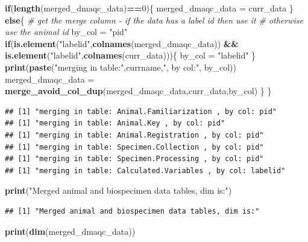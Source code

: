 \documentclass[]{article}
\newenvironment{Shaded}{\begin{snugshade}}{\end{snugshade}}
\newcommand{\KeywordTok}[1]{\textcolor[rgb]{0.13,0.29,0.53}{\textbf{#1}}}
\newcommand{\DecValTok}[1]{\textcolor[rgb]{0.00,0.00,0.81}{#1}}
\newcommand{\StringTok}[1]{\textcolor[rgb]{0.31,0.60,0.02}{#1}}
\newcommand{\CommentTok}[1]{\textcolor[rgb]{0.56,0.35,0.01}{\textit{#1}}}
\newcommand{\ControlFlowTok}[1]{\textcolor[rgb]{0.13,0.29,0.53}{\textbf{#1}}}
\newcommand{\OperatorTok}[1]{\textcolor[rgb]{0.81,0.36,0.00}{\textbf{#1}}}
\newcommand{\NormalTok}[1]{#1}
\begin{document}
\begin{Shaded}
\begin{Highlighting}[]
  \ControlFlowTok{if}\NormalTok{(}\KeywordTok{length}\NormalTok{(merged_dmaqc_data)}\OperatorTok{==}\DecValTok{0}\NormalTok{)\{}
\NormalTok{    merged_dmaqc_data =}\StringTok{ }\NormalTok{curr_data}
\NormalTok{  \}}
  \ControlFlowTok{else}\NormalTok{\{}
    \CommentTok{# get the merge column - if the data has a label id then use it}
    \CommentTok{# otherwise use the animal id}
\NormalTok{    by_col =}\StringTok{ "pid"}
    \ControlFlowTok{if}\NormalTok{(}\KeywordTok{is.element}\NormalTok{(}\StringTok{"labelid"}\NormalTok{,}\KeywordTok{colnames}\NormalTok{(merged_dmaqc_data)) }\OperatorTok{&&}
\StringTok{       }\KeywordTok{is.element}\NormalTok{(}\StringTok{"labelid"}\NormalTok{,}\KeywordTok{colnames}\NormalTok{(curr_data)))\{}
\NormalTok{          by_col =}\StringTok{ "labelid"}
\NormalTok{     \}}
    \KeywordTok{print}\NormalTok{(}\KeywordTok{paste}\NormalTok{(}\StringTok{"merging in table:"}\NormalTok{,currname,}\StringTok{", by col:"}\NormalTok{, by_col))}
\NormalTok{    merged_dmaqc_data =}\StringTok{ }\KeywordTok{merge_avoid_col_dup}\NormalTok{(merged_dmaqc_data,curr_data,by_col)}
\NormalTok{  \}}
\NormalTok{\}}
\end{Highlighting}
\end{Shaded}

\begin{verbatim}
## [1] "merging in table: Animal.Familiarization , by col: pid"
## [1] "merging in table: Animal.Key , by col: pid"
## [1] "merging in table: Animal.Registration , by col: pid"
## [1] "merging in table: Specimen.Collection , by col: pid"
## [1] "merging in table: Specimen.Processing , by col: pid"
## [1] "merging in table: Calculated.Variables , by col: labelid"
\end{verbatim}

\begin{Shaded}
\begin{Highlighting}[]
\KeywordTok{print}\NormalTok{(}\StringTok{"Merged animal and biospecimen data tables, dim is:"}\NormalTok{)}
\end{Highlighting}
\end{Shaded}

\begin{verbatim}
## [1] "Merged animal and biospecimen data tables, dim is:"
\end{verbatim}

\begin{Shaded}
\begin{Highlighting}[]
\KeywordTok{print}\NormalTok{(}\KeywordTok{dim}\NormalTok{(merged_dmaqc_data))}
\end{Highlighting}
\end{Shaded}
\end{document}
